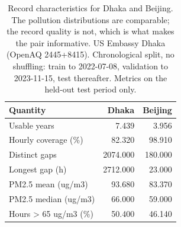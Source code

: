 \begin{table}[htbp]
\caption{Record characteristics for Dhaka and Beijing. The pollution distributions are comparable; the record quality is not, which is what makes the pair informative. US Embassy Dhaka (OpenAQ 2445+8415). Chronological split, no shuffling: train to 2022-07-08, validation to 2023-11-15, test thereafter. Metrics on the held-out test period only.}
\label{tab:cross_city_context}
\begin{tabular}{lrr}
\toprule
Quantity & Dhaka & Beijing \\
\midrule
Usable years & 7.439 & 3.956 \\
Hourly coverage (\%) & 82.320 & 98.910 \\
Distinct gaps & 2074.000 & 180.000 \\
Longest gap (h) & 2712.000 & 23.000 \\
PM2.5 mean (ug/m3) & 93.680 & 83.370 \\
PM2.5 median (ug/m3) & 66.000 & 59.000 \\
Hours > 65 ug/m3 (\%) & 50.400 & 46.140 \\
\bottomrule
\end{tabular}
\end{table}
